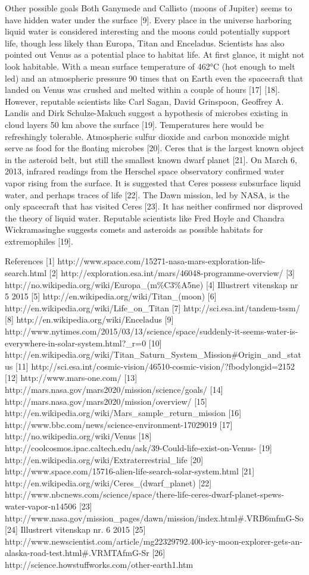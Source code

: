 Other possible goals
Both Ganymede and Callisto (moons of Jupiter) seems to have hidden water under the surface [9]. Every place in the universe harboring liquid water is considered interesting and the moons could potentially support life, though less likely than Europa, Titan and Enceladus. 
Scientists has also pointed out Venus as a potential place to habitat life. At first glance, it might not look habitable. With a mean surface temperature of 462°C (hot enough to melt led) and an atmospheric pressure 90 times that on Earth even the spacecraft that landed on Venus was crushed and melted within a couple of hours [17] [18]. However, reputable scientists like Carl Sagan, David Grinspoon, Geoffrey A. Landis and Dirk Schulze-Makuch suggest a hypothesis of microbes existing in cloud layers 50 km above the surface [19]. Temperatures here would be refreshingly tolerable. Atmospheric sulfur dioxide and carbon monoxide might serve as food for the floating microbes [20].
Ceres that is the largest known object in the asteroid belt, but still the smallest known dwarf planet [21]. On March 6, 2013, infrared readings from the Herschel space observatory confirmed water vapor rising from the surface. It is suggested that Ceres possess subsurface liquid water, and perhaps traces of life [22]. The Dawn mission, led by NASA, is the only spacecraft that has visited Ceres [23]. It has neither confirmed nor disproved the theory of liquid water.
Reputable scientists like Fred Hoyle and Chandra Wickramasinghe suggests comets and asteroids as possible habitats for extremophiles [19].
 
References
[1]	http://www.space.com/15271-nasa-mars-exploration-life-search.html
[2]	http://exploration.esa.int/mars/46048-programme-overview/
[3]	http://no.wikipedia.org/wiki/Europa_(m\%C3\%A5ne)
[4]	Illustrert vitenskap nr 5 2015
[5]	http://en.wikipedia.org/wiki/Titan_(moon)
[6]	http://en.wikipedia.org/wiki/Life_on_Titan
[7]	http://sci.esa.int/tandem-tssm/
[8]	http://en.wikipedia.org/wiki/Enceladus
[9]	http://www.nytimes.com/2015/03/13/science/space/suddenly-it-seems-water-is-everywhere-in-solar-system.html?_r=0
[10]	http://en.wikipedia.org/wiki/Titan_Saturn_System_Mission#Origin_and_status
[11]	http://sci.esa.int/cosmic-vision/46510-cosmic-vision/?fbodylongid=2152
[12]	http://www.mars-one.com/
[13]	http://mars.nasa.gov/mars2020/mission/science/goals/
[14]	http://mars.nasa.gov/mars2020/mission/overview/
[15]	http://en.wikipedia.org/wiki/Mars_sample_return_mission
[16]	http://www.bbc.com/news/science-environment-17029019
[17]	http://no.wikipedia.org/wiki/Venus
[18]	http://coolcosmos.ipac.caltech.edu/ask/39-Could-life-exist-on-Venus-
[19]	http://en.wikipedia.org/wiki/Extraterrestrial_life
[20]	http://www.space.com/15716-alien-life-search-solar-system.html
[21]	http://en.wikipedia.org/wiki/Ceres_(dwarf_planet)
[22]	http://www.nbcnews.com/science/space/there-life-ceres-dwarf-planet-spews-water-vapor-n14506
[23]	http://www.nasa.gov/mission_pages/dawn/mission/index.html#.VRB6mfmG-So
[24]	Illustrert vitenskap nr. 6 2015
[25]	http://www.newscientist.com/article/mg22329792.400-icy-moon-explorer-gets-an-alaska-road-test.html#.VRMTAfmG-Sr
[26]	http://science.howstuffworks.com/other-earth1.htm
